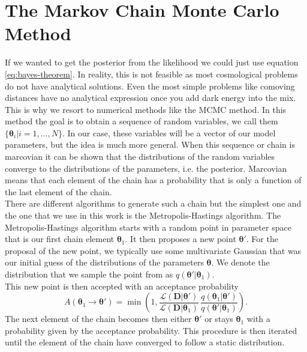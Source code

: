 \documentclass[../main.tex]{subfiles}
\begin{document}
\section{The Markov Chain Monte Carlo Method}
If we wanted to get the posterior from the likelihood we could just use equation \ref{eq:bayes-theorem}. In reality, this is not feasible as most cosmological problems do not have analytical solutions. Even the most simple problems like comoving distances have no analytical expression once you add dark energy into the mix. This is why we resort to numerical methods like the MCMC method. In this method the goal is to obtain a sequence of random variables, we call them $\{\boldsymbol{\theta}_i|i=1,...,N\}$. In our case, these variables will be a vector of our model parameters, but the idea is much more general. When this sequence or chain is marcovian it can be shown that the distributions of the random variables converge to the distributions of the parameters, i.e. the posterior. Marcovian means that each element of the chain has a probability that is only a function of the last element of the chain.\\
There are different algorithms to generate such a chain but the simplest one and the one that we use in this work is the Metropolis-Hastings algorithm. The Metropolis-Hastings algorithm starts with a random point in parameter space that is our first chain element $\boldsymbol{\theta}_1$. It then proposes a new point $\boldsymbol{\theta}'$. For the proposal of the new point, we typically use some multivariate Gaussian that was our initial guess of the distributions of the parameters $\boldsymbol{\theta}$. We denote the distribution that we sample the point from as $q(\boldsymbol{\theta}'|\boldsymbol{\theta}_1)$.\\
This new point is then accepted with an acceptance probability \begin{equation}
    \label{eq:acceptance-rate}
    A(\boldsymbol{\theta}_1 \to \boldsymbol{\theta}') = \min\left(1,\frac{\mathcal{L}(\boldsymbol{D}|\boldsymbol{\theta}')}{\mathcal{L}(\boldsymbol{D}|\boldsymbol{\theta}_1)}\,\frac{q(\boldsymbol{\theta}_1|\boldsymbol{\theta}')}{q(\boldsymbol{\theta}'|\boldsymbol{\theta}_1)}\right).
\end{equation}
The next element of the chain becomes then either $\boldsymbol{\theta}'$ or stays $\boldsymbol{\theta}_1$ with a probability given by the acceptance probability. This procedure is then iterated until the element of the chain have converged to follow a static distribution.\\
\end{document}
